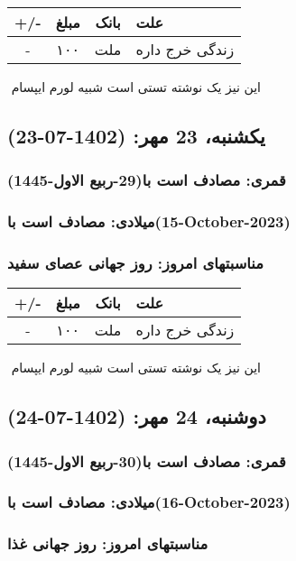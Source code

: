 \documentclass{article}
\newcommand{\rnote}[1]{\marginpar{\textcolor{color}{\StrSubstitute{\##1}{ }{\_}}}}
\newcommand{\myRow}[4]{
    #1 & #2 & #3 & #4 \\ \hline
}
\begin{document}
\begin{tabular}{ | c | c | c | p{5cm} |}
    \hline
    \myRow{ +/- }{مبلغ}{بانک}{علت}
    \myRow{-}{۱۰۰}{ملت}{زندگی خرج داره}
\end{tabular}
\newline
\newline

‌
\rnote{تست}
این نیز یک نوشته تستی است شبیه لورم ایپسام




\newpage
{}
\textcolor{color}{
\section{ یکشنبه، 23 مهر: (1402-07-23) }
\subsubsection*{قمری: مصادف است با(29-ربیع الاول-1445)} 
\subsubsection*{میلادی: مصادف است با(15-October-2023)}
\subsubsection*{مناسبتهای امروز: روز جهانی عصای سفید}
}


\begin{tabular}{ | c | c | c | p{5cm} |}
    \hline
    \myRow{ +/- }{مبلغ}{بانک}{علت}
    \myRow{-}{۱۰۰}{ملت}{زندگی خرج داره}
\end{tabular}
\newline
\newline

‌
\rnote{تست}
این نیز یک نوشته تستی است شبیه لورم ایپسام




\newpage
{}
\textcolor{color}{
\section{ دوشنبه، 24 مهر: (1402-07-24) }
\subsubsection*{قمری: مصادف است با(30-ربیع الاول-1445)} 
\subsubsection*{میلادی: مصادف است با(16-October-2023)}
\subsubsection*{مناسبتهای امروز: روز جهانی غذا}
}
\end{document}
